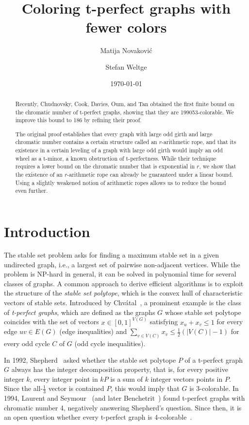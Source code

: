 \documentclass{article}
\begin{document}
\title{Coloring t-perfect graphs with fewer colors}
\author{Matija Novakovi\'c \and Stefan Weltge}
\date{\today}

\maketitle

\begin{abstract}
    Recently, Chudnovsky, Cook, Davies, Oum, and Tan obtained the first finite bound on the chromatic number of t-perfect graphs, showing that they are 199053-colorable.
    We improve this bound to 186 by refining their proof.

    The original proof establishes that every graph with large odd girth and large chromatic number contains a certain structure called an $r$-arithmetic rope, and that its existence in a certain leveling of a graph with large odd girth would imply an odd wheel as a t-minor, a known obstruction of t-perfectness.
    While their technique requires a lower bound on the chromatic number that is exponential in $r$, we show that the existence of an $r$-arithmetic rope can already be guaranteed under a linear bound.
    Using a slightly weakened notion of arithmetic ropes allows us to reduce the bound even further.
\end{abstract}

\section{Introduction}

The stable set problem asks for finding a maximum stable set in a given undirected graph, i.e., a largest set of pairwise non-adjacent vertices.
While the problem is NP-hard in general, it can be solved in polynomial time for several classes of graphs.
A common approach to derive efficient algorithms is to exploit the structure of the \emph{stable set polytope}, which is the convex hull of characteristic vectors of stable sets.
Introduced by Chvátal~\cite{chvatal1975certain}, a prominent example is the class of \emph{t-perfect graphs}, which are defined as the graphs $G$ whose stable set polytope coincides with the set of vectors $x \in [0,1]^{V(G)}$ satisfying $x_u + x_v \le 1$ for every edge $uv \in E(G)$ (edge inequalities) and $\sum_{v \in V(C)} x_v \le \frac12 (|V(C)| - 1)$ for every odd cycle $C$ of $G$ (odd cycle inequalities).

In 1992, Shepherd~\cite[8.14]{jensen2011graph} asked whether the stable set polytope $P$ of a t-perfect graph $G$ always has the integer decomposition property, that is, for every positive integer $k$, every integer point in $kP$ is a sum of $k$ integer vectors points in $P$.
Since the all-$\frac{1}{3}$ vector is contained $P$, this would imply that $G$ is 3-colorable.
In 1994, Laurent and Seymour~\cite[p. 1207]{schrijver2003combinatorial} (and later Benchetrit~\cite{benchetrit2015proprietes,benchetrit20164}) found t-perfect graphs with chromatic number 4, negatively answering Shepherd's question.
Since then, it is an open question whether every t-perfect graph is 4-colorable~\cite[8.14]{jensen2011graph}.
\end{document}
